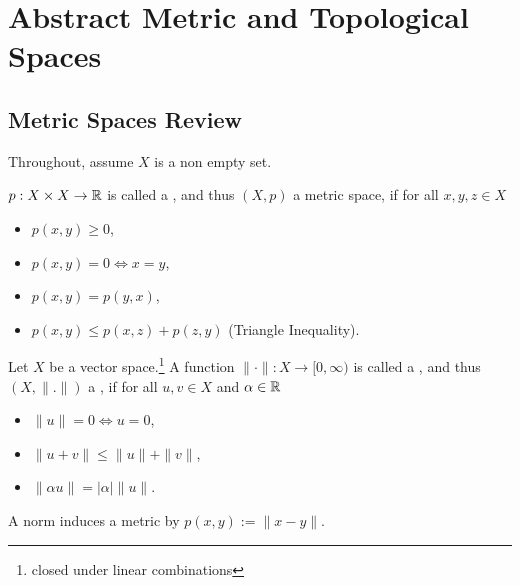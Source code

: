 \section{Abstract Metric and Topological Spaces}
\subsection{Metric Spaces Review }
Throughout, assume $X$ is a non empty set.
\begin{defn}[Metric]
    $p : X \times X \to \mathbb{R}$ is called a , and thus 
    $(X, p)$ a metric space, if for all $x,y,z \in X$
    \begin{itemize}
        \item $p(x,y) \geq 0$, 
        \item $p(x,y) = 0 \iff x = y$,
        \item $p(x,y) = p(y,x)$,
        \item $p(x,y) \leq p(x,z) + p(z,y)$ (Triangle Inequality).   
    \end{itemize}
\end{defn}

\begin{defn}[Norm]
    Let $X$ be a vector space.\footnote{closed under linear combinations} 
    A function $\| \cdot \| : X \to [0,\infty)$ 
    is called a , and thus $(X, \| . \| )$ a ,
     if for all $u,v \in X$ and $\alpha \in \mathbb{R}$
    \begin{itemize}
        \item $\| u \| = 0 \iff u = 0$,
        \item $\| u + v \| \leq \| u \| + \| v \| $,
        \item $\| \alpha u \| = \left| \alpha \right|  \| u \| $.
    \end{itemize}
\end{defn}

\begin{rem}
    A norm induces a metric by $p(x,y) := \| x-y \| $.
\end{rem}

